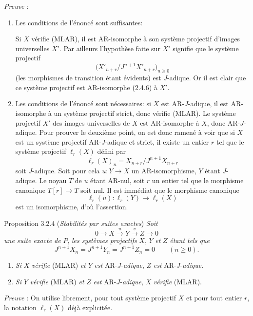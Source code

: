 \emph{Preuve} :
\begin{enumerate}[label=(\alph*)]
\item Les conditions de l'énoncé sont suffisantes:

Si $X$ vérifie (MLAR), il est AR-isomorphe à son système projectif d'images universelles $X'$. Par ailleurs l'hypothèse faite sur $X'$ signifie que le système projectif
\[
\bigl(X'_{n+r}/J^{n+1}X'_{n+r}\bigr)_{n\ge0}
\]
(les morphismes de transition étant évidents) est $J$-adique. Or il est clair que ce système projectif est AR-isomorphe (2.4.6) à $X'$.
\item Les conditions de l'énoncé sont nécessaires: si $X$ est AR-$J$-adique, il est AR-isomorphe à un système projectif strict, donc vérifie (MLAR). 
Le
système projectif $X'$ des images universelles de $X$ est AR-isomorphe à $X$, donc AR-$J$-adique. Pour prouver le deuxième point, on est donc ramené à voir que si $X$ est un système projectif AR-$J$-adique et strict, il existe un entier $r$ tel que le système projectif $\ell_r(X)$ défini par
\[
\ell_r(X)_n=X_{n+r}/J^{n+1}X_{n+r}
\]
soit $J$-adique. Soit pour cela $u:Y\to X$ un AR-isomorphisme, $Y$ étant $J$-adique. Le noyau $T$ de $u$ étant AR-nul, soit $r$ un entier tel que le morphisme canonique $T[r]\to T$ soit nul. Il est immédiat que le morphisme canonique
\[
\ell_r(u):\ell_r(Y)\longrightarrow\ell_r(X)
\]
est un isomorphisme, d'où l'assertion.
\end{enumerate}

\begin{statement}{Proposition 3.2.4 (\emph{Stabilités par suites exactes})}
\emph{Soit}
\[
0\longrightarrow X\stackrel{u}{\longrightarrow}Y\stackrel{v}{\longrightarrow}Z\longrightarrow0
\]
\emph{une suite exacte de} $P$, \emph{les systèmes projectifs} $X$, $Y$ \emph{et} $Z$ \emph{étant tels que}
\[
J^{n+1}X_n=J^{n+1}Y_n=J^{n+1}Z_n=0\qquad(n\ge0).
\]
\begin{enumerate}[label=(\roman*)]
\item \emph{Si} $X$ \emph{vérifie} (MLAR) \emph{et} $Y$ \emph{est} AR-$J$-\emph{adique}, $Z$ \emph{est} AR-$J$-\emph{adique}.
\item \emph{Si} $Y$ \emph{vérifie} (MLAR) \emph{et} $Z$ \emph{est} AR-$J$-\emph{adique}, $X$ \emph{vérifie} (MLAR).
\end{enumerate}
\end{statement}

\emph{Preuve} : On utilise librement, pour tout système projectif $X$ et pour tout entier $r$, la notation $\ell_r(X)$ déjà explicitée.

